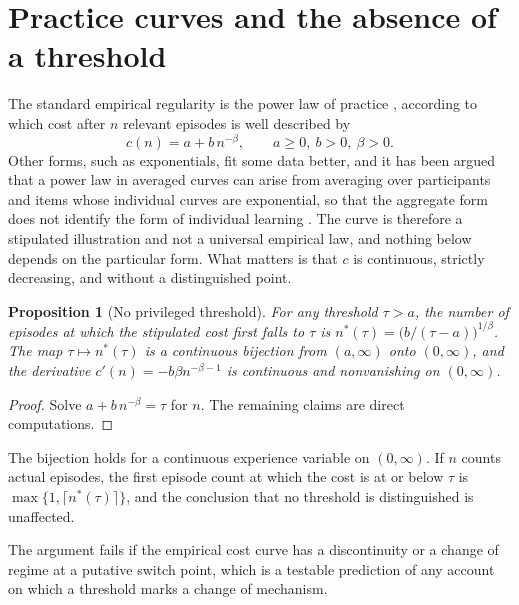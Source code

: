 \documentclass[11pt]{report}
\newtheorem{proposition}{Proposition}[chapter]
\theoremstyle{remark}
\theoremstyle{definition}
\begin{document}
\section{Practice curves and the absence of a threshold}

The standard empirical regularity is the power law of practice \cite{newell1981}, according to which cost after $n$ relevant episodes is well described by
\begin{equation}
c(n)=a+b\,n^{-\beta},\qquad a\ge 0,\ b>0,\ \beta>0 .\label{eq:power}
\end{equation}
Other forms, such as exponentials, fit some data better, and it has been argued that a power law in averaged curves can arise from averaging over participants and items whose individual curves are exponential, so that the aggregate form does not identify the form of individual learning \cite{heathcote2000}. The curve is therefore a stipulated illustration and not a universal empirical law, and nothing below depends on the particular form. What matters is that $c$ is continuous, strictly decreasing, and without a distinguished point.

\begin{proposition}[No privileged threshold]
For any threshold $\tau>a$, the number of episodes at which the stipulated cost first falls to $\tau$ is $n^*(\tau)=\bigl(b/(\tau-a)\bigr)^{1/\beta}$. The map $\tau\mapsto n^*(\tau)$ is a continuous bijection from $(a,\infty)$ onto $(0,\infty)$, and the derivative $c'(n)=-b\beta n^{-\beta-1}$ is continuous and nonvanishing on $(0,\infty)$.
\end{proposition}

\begin{proof}
Solve $a+b\,n^{-\beta}=\tau$ for $n$. The remaining claims are direct computations.
\end{proof}

The bijection holds for a continuous experience variable on $(0,\infty)$. If $n$ counts actual episodes, the first episode count at which the cost is at or below $\tau$ is $\max\{1,\lceil n^*(\tau)\rceil\}$, and the conclusion that no threshold is distinguished is unaffected.

The argument fails if the empirical cost curve has a discontinuity or a change of regime at a putative switch point, which is a testable prediction of any account on which a threshold marks a change of mechanism.
\end{document}
